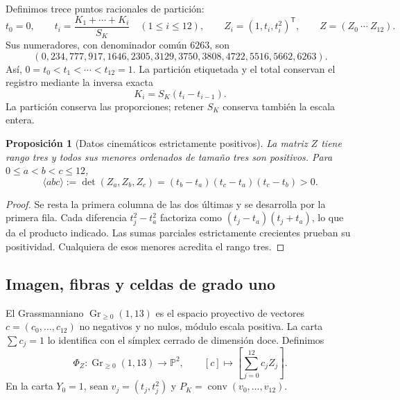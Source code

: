 \documentclass[a4paper,10pt]{article}
\newtheorem{proposition}[theorem]{Proposición}
\theoremstyle{definition}\newtheorem{definition}[theorem]{Definición}
\theoremstyle{remark}\newtheorem{remark}[theorem]{Observación}
\numberwithin{equation}{section}
\begin{document}
Definimos trece puntos racionales de partición:
\begin{equation}
 t_0=0,\qquad t_i=\frac{K_1+\cdots+K_i}{S_K}\quad(1\leq i\leq12),
 \qquad Z_i=(1,t_i,t_i^2)^\mathsf T,\qquad Z=(Z_0\ \cdots\ Z_{12}).
 \label{eq:polygon-Z}
\end{equation}
Sus numeradores, con denominador común \(6263\), son
\[
 (0,234,777,917,1646,2305,3129,3750,3808,4722,5516,5662,6263).
\]
Así, \(0=t_0<t_1<\cdots<t_{12}=1\). La partición etiquetada y el total
conservan el registro mediante la inversa exacta
\begin{equation}
 K_i=S_K(t_i-t_{i-1}).
 \label{eq:polygon-recover-K}
\end{equation}
La partición conserva las proporciones; retener \(S_K\) conserva también
la escala entera.

\begin{proposition}[Datos cinemáticos estrictamente positivos]
\label{prop:polygon-vandermonde}
La matriz \(Z\) tiene rango tres y todos sus menores ordenados de tamaño
tres son positivos. Para \(0\leq a<b<c\leq12\),
\begin{equation}
 \langle abc\rangle:=\det(Z_a,Z_b,Z_c)
 =(t_b-t_a)(t_c-t_a)(t_c-t_b)>0.
 \label{eq:polygon-minors}
\end{equation}
\end{proposition}
\begin{proof}
Se resta la primera columna de las dos últimas y se desarrolla por la
primera fila. Cada diferencia \(t_j^2-t_a^2\) factoriza como
\((t_j-t_a)(t_j+t_a)\), lo que da el producto indicado. Las sumas parciales
estrictamente crecientes prueban su positividad. Cualquiera de esos
menores acredita el rango tres.
\end{proof}

\subsection{Imagen, fibras y celdas de grado uno}

El Grassmanniano \(\operatorname{Gr}_{\geq0}(1,13)\) es el espacio
proyectivo de vectores \(c=(c_0,\ldots,c_{12})\) no negativos y no nulos,
módulo escala positiva. La carta \(\sum c_j=1\) lo identifica con el
símplex cerrado de dimensión doce. Definimos
\begin{equation}
 \Phi_Z:\operatorname{Gr}_{\geq0}(1,13)\longrightarrow\mathbb P^2,
 \qquad[c]\longmapsto\left[\sum_{j=0}^{12}c_jZ_j\right].
 \label{eq:polygon-map}
\end{equation}
En la carta \(Y_0=1\), sean \(v_j=(t_j,t_j^2)\) y
\(P_K=\operatorname{conv}(v_0,\ldots,v_{12})\).
\end{document}
